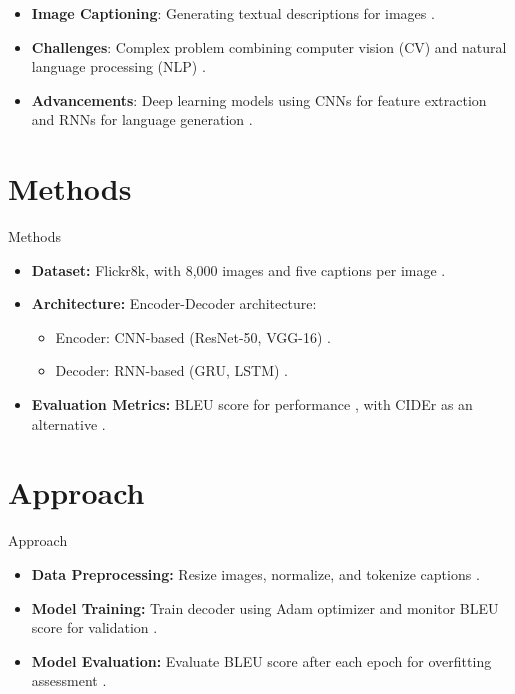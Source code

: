 \documentclass[10pt]{beamer}
\institute{Universit\"at Hamburg\\\trinstitute}
\title{\trtitle}
\subtitle{\trtype}
\author{\trauthor}
\date{}
\theoremstyle{remark}
\begin{document}
\renewcommand{\arraystretch}{1.2}

\begin{frame}[plain]
  \titlepage
\end{frame}


\begin{frame}
	\begin{itemize}
			\item \textbf{Image Captioning}: Generating textual descriptions for images \cite{vinyals:2015}.
			\item \textbf{Challenges}: Complex problem combining computer vision (CV) and natural language processing (NLP) \cite{xu}.
			\item \textbf{Advancements}: Deep learning models using CNNs for feature extraction and RNNs for language generation \cite{he, simonyan}.
	\end{itemize}
\end{frame}

\section{Methods}
\begin{frame}{Methods}
	\begin{itemize}
			\item \textbf{Dataset:} Flickr8k, with 8,000 images and five captions per image \cite{vinyals:2015}.
			\item \textbf{Architecture:} Encoder-Decoder architecture:
					\begin{itemize}
							\item Encoder: CNN-based (ResNet-50, VGG-16) \cite{he, simonyan}.
							\item Decoder: RNN-based (GRU, LSTM) \cite{hochreiter}.
					\end{itemize}
			\item \textbf{Evaluation Metrics:} BLEU score for performance \cite{papineni}, with CIDEr as an alternative \cite{vedantam}.
	\end{itemize}
\end{frame}

\section{Approach}
\begin{frame}{Approach}
	\begin{itemize}
			\item \textbf{Data Preprocessing:} Resize images, normalize, and tokenize captions \cite{vinyals:2015}.
			\item \textbf{Model Training:} Train decoder using Adam optimizer and monitor BLEU score for validation \cite{papineni}.
			\item \textbf{Model Evaluation:} Evaluate BLEU score after each epoch for overfitting assessment \cite{rennie}.
	\end{itemize}
\end{frame}
\end{document}
